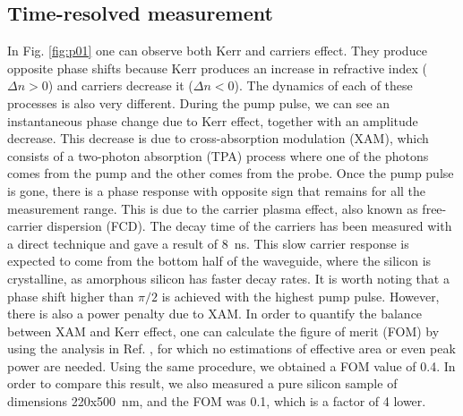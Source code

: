 \documentclass[conference]{IEEEtran}
\begin{document}
\subsection{Time-resolved measurement}
In Fig. \ref{fig:p01} one can observe both Kerr and carriers effect. They produce opposite phase shifts because Kerr produces an increase in refractive index ($ \Delta n > 0 $) and carriers decrease it ($ \Delta n < 0 $).  The dynamics of each of these processes is also very different. During the pump pulse, we can see an instantaneous phase change due to Kerr effect, together with an amplitude decrease. This decrease is due to cross-absorption modulation (XAM), which consists of a two-photon absorption (TPA) process where one of the photons comes from the pump and the other comes from the probe. Once the pump pulse is gone, there is a phase response with opposite sign that remains for all the measurement range. This is due to the carrier plasma effect, also known as free-carrier dispersion (FCD). The decay time of the carriers has been measured with a direct technique and gave a result of 8~ns. This slow carrier response is expected to come from the bottom half of the waveguide, where the silicon is crystalline, as amorphous silicon has faster decay rates.
It is worth noting that a phase shift higher than $\pi/2$ is achieved with the highest pump pulse. However, there is also a power penalty due to XAM. In order to quantify the balance between XAM and Kerr effect, one can calculate the figure of merit (FOM) by using the analysis in Ref. \cite{Vallaitis}, for which no estimations of effective area or even peak power are needed. Using the same procedure, we obtained a FOM value of 0.4. In order to compare this result, we also measured a pure silicon sample of dimensions 220x500~nm, and the FOM was 0.1, which is a factor of 4 lower.
\end{document}
